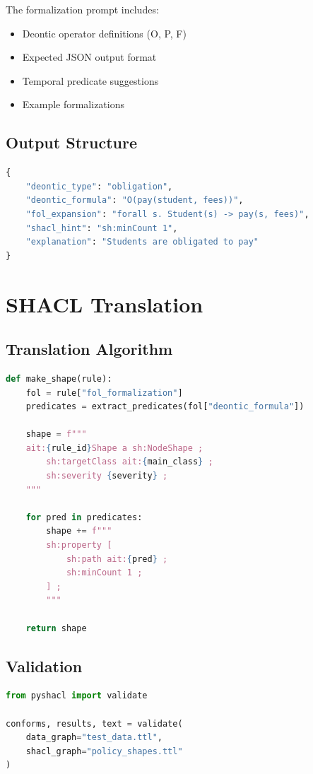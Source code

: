 The formalization prompt includes:
\begin{itemize}
    \item Deontic operator definitions (O, P, F)
    \item Expected JSON output format
    \item Temporal predicate suggestions
    \item Example formalizations
\end{itemize}

\subsection{Output Structure}

\begin{lstlisting}[language=Python]
{
    "deontic_type": "obligation",
    "deontic_formula": "O(pay(student, fees))",
    "fol_expansion": "forall s. Student(s) -> pay(s, fees)",
    "shacl_hint": "sh:minCount 1",
    "explanation": "Students are obligated to pay"
}
\end{lstlisting}

\section{SHACL Translation}

\subsection{Translation Algorithm}

\begin{lstlisting}[language=Python]
def make_shape(rule):
    fol = rule["fol_formalization"]
    predicates = extract_predicates(fol["deontic_formula"])
    
    shape = f"""
    ait:{rule_id}Shape a sh:NodeShape ;
        sh:targetClass ait:{main_class} ;
        sh:severity {severity} ;
    """
    
    for pred in predicates:
        shape += f"""
        sh:property [
            sh:path ait:{pred} ;
            sh:minCount 1 ;
        ] ;
        """
    
    return shape
\end{lstlisting}

\subsection{Validation}

\begin{lstlisting}[language=Python]
from pyshacl import validate

conforms, results, text = validate(
    data_graph="test_data.ttl",
    shacl_graph="policy_shapes.ttl"
)
\end{lstlisting}

